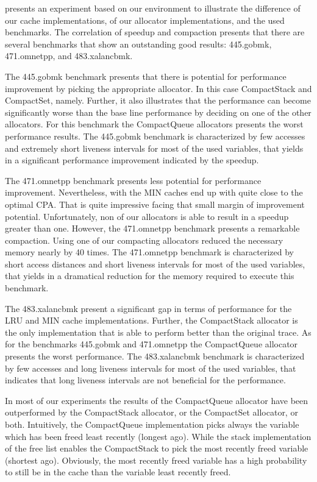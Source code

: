 \documentclass[onecolumn, openright, master, english, signatures]{dbrgrptt}
\begin{document}
 presents an experiment based on our environment to illustrate the difference of our cache implementations, of our allocator implementations, and the used benchmarks.
The correlation of speedup and compaction presents that there are several benchmarks that show an outstanding good results: 445.gobmk, 471.omnetpp, and 483.xalancbmk.

The 445.gobmk benchmark presents that there is potential for performance improvement by picking the appropriate allocator.
In this case CompactStack and CompactSet, namely.
Further, it also illustrates that the performance can become significantly worse than the base line performance by deciding on one of the other allocators.
For this benchmark the CompactQueue allocators presents the worst performance results.
The 445.gobmk benchmark is characterized by few accesses and extremely short liveness intervals for most of the used variables, that yields in a significant performance improvement indicated by the speedup.

The 471.omnetpp benchmark presents less potential for performance improvement.
Nevertheless, with the \ac{MIN} caches end up with quite close to the optimal \ac{CPA}.
That is quite impressive facing that small margin of improvement potential.
Unfortunately, non of our allocators is able to result in a speedup greater than one.
However, the 471.omnetpp benchmark presents a remarkable compaction.
Using one of our compacting allocators reduced the necessary memory nearly by 40 times.
The 471.omnetpp benchmark is characterized by short access distances and short liveness intervals for most of the used variables, that yields in a dramatical reduction for the memory required to execute this benchmark.

The 483.xalancbmk present a significant gap in terms of performance for the \ac{LRU} and \ac{MIN} cache implementations.
Further, the CompactStack allocator is the only implementation that is able to perform better than the original \ac{trace}.
As for the benchmarks 445.gobmk and 471.omnetpp the CompactQueue allocator presents the worst performance.
The 483.xalancbmk benchmark is characterized by few accesses and long liveness intervals for most of the used variables, that indicates that long liveness intervals are not beneficial for the performance.

In most of our experiments the results of the CompactQueue allocator have been outperformed by the CompactStack allocator, or the CompactSet allocator, or both.
Intuitively, the CompactQueue implementation picks always the variable which has been freed least recently (longest ago).
While the stack implementation of the free list enables the CompactStack to pick the most recently freed variable (shortest ago).
Obviously, the most recently freed variable has a high probability to still be in the cache than the variable least recently freed.
\end{document}
